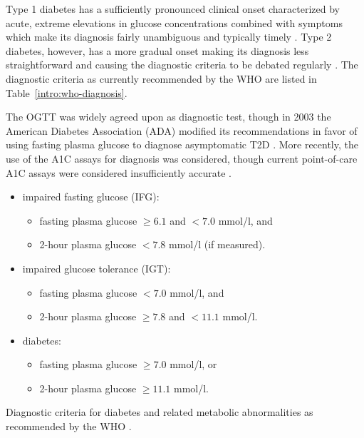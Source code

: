 Type 1 diabetes has a sufficiently pronounced clinical onset characterized by acute, extreme elevations in glucose concentrations combined with symptoms which make its diagnosis fairly unambiguous and typically timely \citep{international2009international}. Type 2 diabetes, however, has a more gradual onset making its diagnosis less straightforward and causing the diagnostic criteria to be debated regularly \citep{world2006definition, international2009international}.  The diagnostic criteria as currently recommended by the WHO are listed in Table~\ref{intro:who-diagnosis}.

The OGTT was widely agreed upon as diagnostic test, though in 2003 the American Diabetes Association (ADA) modified its recommendations in favor of using fasting plasma glucose to diagnose asymptomatic T2D \citep{world2006definition}. More recently, the use of the A1C assays for diagnosis was considered, though current point-of-care A1C assays were considered insufficiently accurate \citep{international2009international}.

\begin{table}[!h]
\colorbox{gray!20!white}{\parbox{\textwidth}{
\begin{itemize}
\item impaired fasting glucose (IFG):
\begin{itemize}
\item fasting plasma glucose $\geq 6.1$ and $< 7.0$ mmol/l, and
\item 2-hour plasma glucose $< 7.8$ mmol/l (if measured).
\end{itemize}
\item impaired glucose tolerance (IGT):
\begin{itemize}
\item fasting plasma glucose $< 7.0$ mmol/l, and
\item 2-hour plasma glucose $\geq 7.8$ and $< 11.1$ mmol/l.
\end{itemize}
\item diabetes:
\begin{itemize}
\item fasting plasma glucose $\geq 7.0$ mmol/l, or
\item 2-hour plasma glucose $\geq 11.1$ mmol/l.
\end{itemize}
\end{itemize}
}}
\caption{Diagnostic criteria for diabetes and related metabolic abnormalities as recommended by the WHO \citep{world2006definition}.} \label{intro:who-diagnosis}
\end{table}

